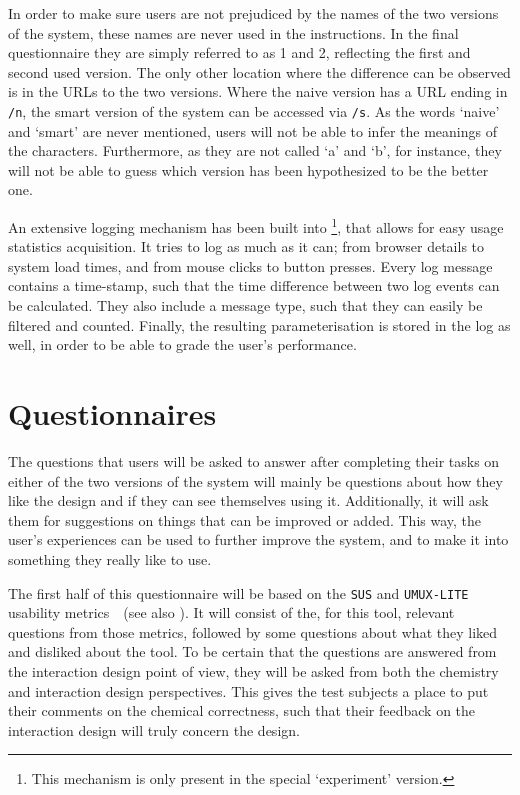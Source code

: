 In order to make sure users are not prejudiced by the names of the two versions of the system, these names are never used in the instructions. In the final questionnaire they are simply referred to as 1 and 2, reflecting the first and second used version. The only other location where the difference can be observed is in the URLs to the two versions. Where the naive version has a URL ending in \verb|/n|, the smart version of the system can be accessed via \verb|/s|. As the words `naive' and `smart' are never mentioned, users will not be able to infer the meanings of the characters. Furthermore, as they are not called `a' and `b', for instance, they will not be able to guess which version has been hypothesized to be the better one.

An extensive logging mechanism has been built into \oframp\footnote{This mechanism is only present in the special `experiment' version.}, that allows for easy usage statistics acquisition. It tries to log as much as it can; from browser details to system load times, and from mouse clicks to button presses. Every log message contains a time-stamp, such that the time difference between two log events can be calculated. They also include a message type, such that they can easily be filtered and counted. Finally, the resulting parameterisation is stored in the log as well, in order to be able to grade the user's performance.



\section{Questionnaires}
The questions that users will be asked to answer after completing their tasks on either of the two versions of the system will mainly be questions about how they like the design and if they can see themselves using it. Additionally, it will ask them for suggestions on things that can be improved or added. This way, the user's experiences can be used to further improve the system, and to make it into something they really like to use.

The first half of this questionnaire will be based on the \verb|SUS| and \verb|UMUX-LITE| usability metrics~\cite{lewis2013umux}~(see also ). It will consist of the, for this tool, relevant questions from those metrics, followed by some questions about what they liked and disliked about the tool. To be certain that the questions are answered from the interaction design point of view, they will be asked from both the chemistry and interaction design perspectives. This gives the test subjects a place to put their comments on the chemical correctness, such that their feedback on the interaction design will truly concern the design.

